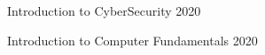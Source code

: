 {Introduction to CyberSecurity} \hfill 2020\par
{Introduction to Computer Fundamentals}  \hfill 2020\par
